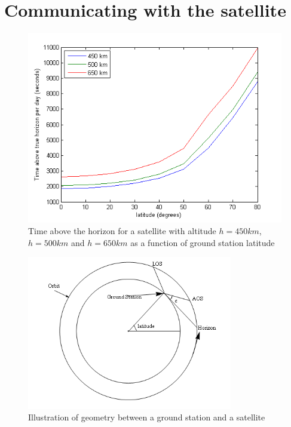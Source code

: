 \section{Communicating with the satellite}

\begin{figure}
  \begin{center}
    \includegraphics[width=1.0\textwidth]{Figures/accesstid450_500_650horizont}
  \end{center}
  \caption[LOS for 450 and 650]{Time above the horizon for a satellite with altitude $h=450km$, $h=500km$ and $h=650km$ as a function of ground station latitude}
  \label{fig:access_horizon}
\end{figure}

\begin{figure}
  \begin{center}
    \includegraphics[trim = 5mm 30mm 5mm 0mm, clip, width=0.8\textwidth]{Figures/groundstation_satellite_geometry}
  \end{center}
  \caption[Ground station satellite geometry]{Illustration of geometry between a ground station and a satellite}
  \label{fig:ground_station_satellite_geometry}
\end{figure}

